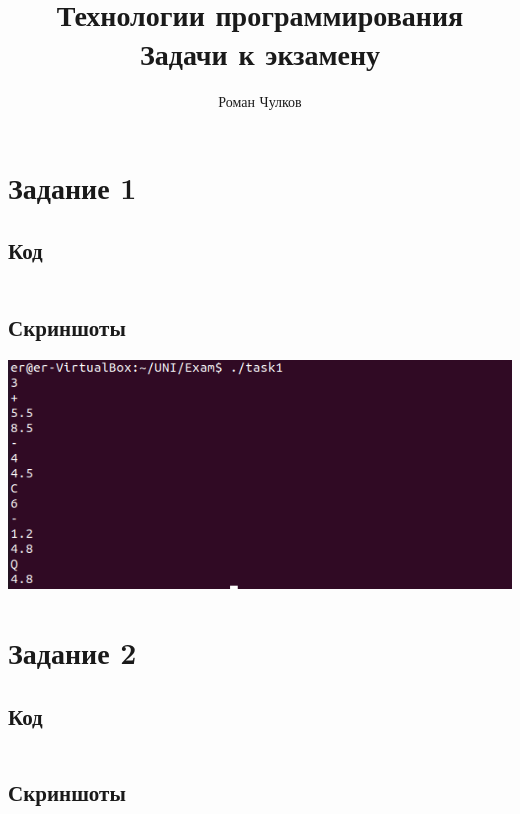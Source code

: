 \documentclass{article}
\title{Технологии программирования \\
\large Задачи к экзамену}
\author{Роман Чулков}
\begin{document}
\maketitle

\pagebreak

\section{Задание 1}

    \subsection{Код}

        \inputminted[frame=single, fontsize=\small]{cpp}{task1/task1.cpp}

    \subsection{Скриншоты}

        \includegraphics[scale=0.5]{task1/task1.png}

\pagebreak

\section{Задание 2}

    \subsection{Код}

        \inputminted[frame=single, fontsize=\small]{cpp}{task2/task2.cpp}

    \subsection{Скриншоты}
\end{document}
